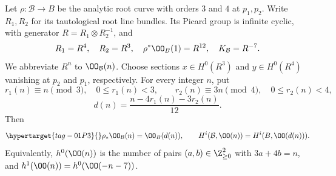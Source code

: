 \begin{proposition}\hypertarget{tag-01SM}{}\label{inv:D1.1}

Let $\rho:\mathcal B\to B$ be the analytic root curve with orders $3$ and
$4$ at $p_1,p_2$. Write $R_1,R_2$ for its tautological root line bundles.
Its Picard group is infinite cyclic, with generator
$R=R_1\otimes R_2^{-1}$, and
\[
 R_1=R^4,\quad R_2=R^3,\quad \rho^*\OO_B(1)=R^{12},
 \quad K_{\mathcal B}=R^{-7}.
\]
We abbreviate $R^n$ to $\OO_{\mathcal B}(n)$. Choose sections
$x\in H^0(R^3)$ and $y\in H^0(R^4)$ vanishing at $p_2$ and $p_1$,
respectively. For every integer $n$, put
\[
 r_1(n)\equiv n\pmod3,\quad 0\le r_1(n)<3,
 \qquad r_2(n)\equiv3n\pmod4,\quad0\le r_2(n)<4,
\]
\[
 d(n)=\frac{n-4r_1(n)-3r_2(n)}{12}.
\]
Then
\begin{equation}
 \hypertarget{tag-01P3}{}\label{fam:eq:ab-root-degree}
\rho_*\OO_{\mathcal B}(n)=\OO_B(d(n)),\qquad
 H^i(\mathcal B,\OO(n))=H^i(B,\OO(d(n))).                 
\end{equation}
Equivalently, $h^0(\OO(n))$ is the number of pairs
$(a,b)\in\Z_{\ge0}^2$ with $3a+4b=n$, and
$h^1(\OO(n))=h^0(\OO(-n-7))$.
\end{proposition}



